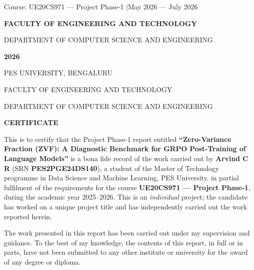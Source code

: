 \documentclass[12pt,a4paper]{report}
\begin{document}
\begin{titlepage}
\vfill

{\normalsize Course: UE20CS971 --- Project Phase-1 \quad$\vert$\quad May 2026 --- July 2026\par}
\vspace{0.6em}
{\large\bfseries FACULTY OF ENGINEERING AND TECHNOLOGY\par}
{\normalsize DEPARTMENT OF COMPUTER SCIENCE AND ENGINEERING\par}
\vspace{0.4em}
{\large\bfseries 2026\par}

\end{titlepage}

\thispagestyle{empty}
\begin{center}
{\large PES UNIVERSITY, BENGALURU\par}
{\normalsize FACULTY OF ENGINEERING AND TECHNOLOGY\par}
{\normalsize DEPARTMENT OF COMPUTER SCIENCE AND ENGINEERING\par}
\vspace{1.0em}
{\Large\bfseries CERTIFICATE\par}
\end{center}
\vspace{1.0em}

This is to certify that the Project Phase-1 report entitled
\textbf{``Zero-Variance Fraction (ZVF): A Diagnostic Benchmark for GRPO
Post-Training of Language Models''} is a bona fide record of the work carried out
by \textbf{Arvind C R} (SRN \textbf{PES2PGE24DS140}), a student of the Master of
Technology programme in Data Science and Machine Learning, PES University, in
partial fulfilment of the requirements for the course \textbf{UE20CS971 ---
Project Phase-1}, during the academic year 2025--2026. This is an
\emph{individual} project; the candidate has worked on a unique project title and
has independently carried out the work reported herein.

\vspace{0.6em}

The work presented in this report has been carried out under my supervision and
guidance. To the best of my knowledge, the contents of this report, in full or in
parts, have not been submitted to any other institute or university for the award
of any degree or diploma.
\end{document}

